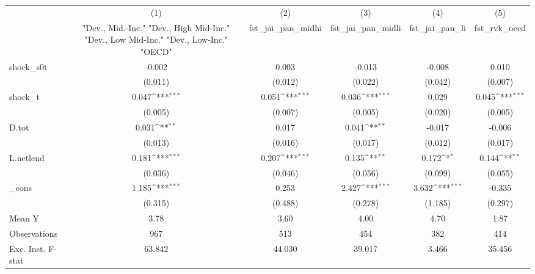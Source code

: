 {
\def\sym#1{\ifmmode^{#1}\else\(^{#1}\)\fi}
\begin{tabular}{l*{5}{c}}
\toprule
            &\multicolumn{1}{c}{(1)}&\multicolumn{1}{c}{(2)}&\multicolumn{1}{c}{(3)}&\multicolumn{1}{c}{(4)}&\multicolumn{1}{c}{(5)}\\
            &\multicolumn{1}{c}{ "Dev., Mid.-Inc." "Dev., High Mid-Inc." "Dev., Low Mid-Inc." "Dev., Low-Inc." "OECD" }&\multicolumn{1}{c}{fst\_jai\_pan\_midhi}&\multicolumn{1}{c}{fst\_jai\_pan\_midli}&\multicolumn{1}{c}{fst\_jai\_pan\_li}&\multicolumn{1}{c}{fst\_rvk\_oecd}\\
\midrule
shock\_s0t   &      -0.002         &       0.003         &      -0.013         &      -0.008         &       0.010         \\
            &     (0.011)         &     (0.012)         &     (0.022)         &     (0.042)         &     (0.007)         \\
\addlinespace
shock\_t     &       0.047\sym{***}&       0.051\sym{***}&       0.036\sym{***}&       0.029         &       0.045\sym{***}\\
            &     (0.005)         &     (0.007)         &     (0.005)         &     (0.020)         &     (0.005)         \\
\addlinespace
D.tot       &       0.031\sym{**} &       0.017         &       0.041\sym{**} &      -0.017         &      -0.006         \\
            &     (0.013)         &     (0.016)         &     (0.017)         &     (0.012)         &     (0.017)         \\
\addlinespace
L.netlend   &       0.181\sym{***}&       0.207\sym{***}&       0.135\sym{**} &       0.172\sym{*}  &       0.144\sym{**} \\
            &     (0.036)         &     (0.046)         &     (0.056)         &     (0.099)         &     (0.055)         \\
\addlinespace
\_cons      &       1.185\sym{***}&       0.253         &       2.427\sym{***}&       3.632\sym{***}&      -0.335         \\
            &     (0.315)         &     (0.488)         &     (0.278)         &     (1.185)         &     (0.297)         \\
\midrule
Mean Y      &        3.78         &        3.60         &        4.00         &        4.70         &        1.87         \\
Observations&         967         &         513         &         454         &         382         &         414         \\
Exc. Inst. F-stat&      63.842         &      44.030         &      39.017         &       3.466         &      35.456         \\
\bottomrule
\end{tabular}
}
